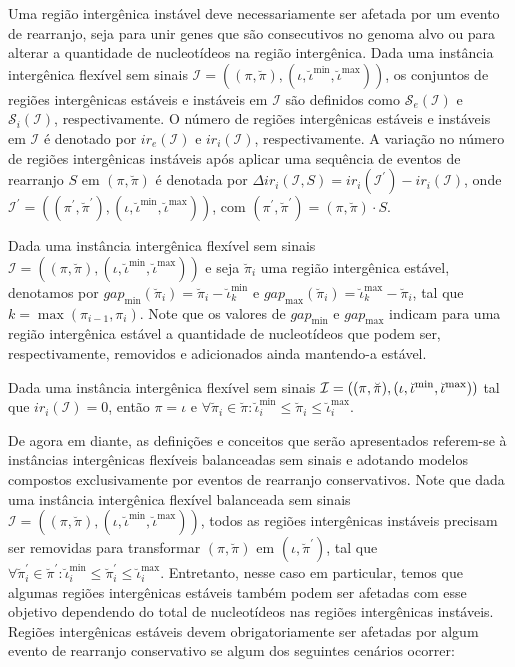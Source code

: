 Uma região intergênica instável deve necessariamente ser afetada por um evento de rearranjo, seja para unir genes que são consecutivos no genoma alvo ou para alterar a quantidade de nucleotídeos na região intergênica. Dada uma instância intergênica flexível sem sinais $\mathcal{I} = ((\pi,\breve\pi),(\iota,\breve\iota^{\min},\breve\iota^{\max}))$, os conjuntos de regiões intergênicas estáveis e instáveis em $\mathcal{I}$ são definidos como $\mathcal{S}_e(\mathcal{I})$ e $\mathcal{S}_i(\mathcal{I})$, respectivamente. O número de regiões intergênicas estáveis e instáveis em $\mathcal{I}$ é denotado por $ir_e(\mathcal{I})$ e $ir_i(\mathcal{I})$, respectivamente. A variação no número de regiões intergênicas instáveis após aplicar uma sequência de eventos de rearranjo $S$ em $(\pi,\breve\pi)$ é denotada por  $\Delta ir_i(\mathcal{I},S) = ir_i(\mathcal{I}^{\prime}) - ir_i(\mathcal{I})$, onde $\mathcal{I}^{\prime} = ((\pi^{\prime}, \breve\pi^{\prime}),(\iota,\breve\iota^{\min},\breve\iota^{\max}))$, com $(\pi^{\prime}, \breve\pi^{\prime}) = (\pi, \breve\pi) \cdot S$.

Dada uma instância intergênica flexível sem sinais $\mathcal{I} = ((\pi,\breve\pi),(\iota,\breve\iota^{\min},\breve\iota^{\max}))$ e seja $\breve\pi_i$ uma região intergênica estável, denotamos por $gap_{\min}(\breve\pi_i) = \breve\pi_i - \breve\iota^{\min}_k$ e $gap_{\max}(\breve\pi_i) = \breve\iota^{\max}_k - \breve\pi_i$, tal que $k = \max(\pi_{i-1}, \pi_i)$. Note que os valores de $gap_{\min}$ e $gap_{\max}$ indicam para uma região intergênica estável a quantidade de nucleotídeos que podem ser, respectivamente, removidos e adicionados ainda mantendo-a estável.

\begin{remark}\label{remark:EUSNDMWS}
Dada uma instância intergênica flexível sem sinais $\mathcal{I} = ((\pi,\breve\pi),\break(\iota,\breve\iota^{\min},\breve\iota^{\max}))$ tal que $ir_i(\mathcal{I}) = 0$, então $\pi = \iota$ e $\forall \breve\pi_i \in \breve\pi: \breve\iota^{\min}_i \le \breve\pi_i \le \breve\iota^{\max}_i$.
\end{remark}

De agora em diante, as definições e conceitos que serão apresentados referem-se à instâncias intergênicas flexíveis balanceadas sem sinais e adotando modelos compostos exclusivamente por eventos de rearranjo conservativos. Note que dada uma instância intergênica flexível balanceada sem sinais $\mathcal{I} = ((\pi,\breve\pi),(\iota,\breve\iota^{\min},\breve\iota^{\max}))$, todos as regiões intergênicas instáveis precisam ser removidas para transformar $(\pi,\breve\pi)$ em $(\iota,\breve\pi^{\prime})$, tal que $\forall \breve\pi^{\prime}_i \in \breve\pi^{\prime} : \breve\iota^{\min}_i \le \breve\pi^{\prime}_i \le \breve\iota^{\max}_i$. Entretanto, nesse caso em particular, temos que algumas regiões intergênicas estáveis também podem ser afetadas com esse objetivo dependendo do total de nucleotídeos nas regiões intergênicas instáveis. Regiões intergênicas estáveis devem obrigatoriamente ser afetadas por algum evento de rearranjo conservativo se algum dos seguintes cenários ocorrer:

